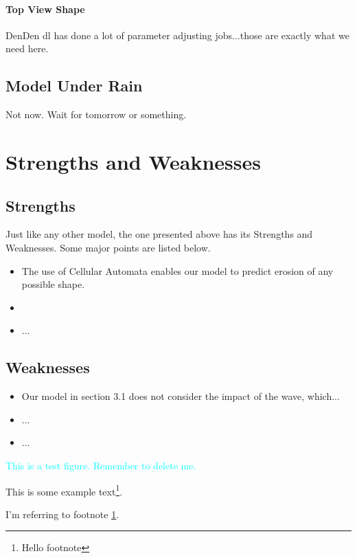 \documentclass[12pt]{article}
\begin{document}
\paragraph{Top View Shape}
DenDen dl has done a lot of parameter adjusting jobs...those are exactly what we need here.
\subsection{Model Under Rain}
Not now. Wait for tomorrow or something.


\section{Strengths and Weaknesses}
\subsection{Strengths}
Just like any other model, the one presented above has its Strengths and Weaknesses. Some major points are listed below.
\begin{itemize}
    \item [1)]
          The use of Cellular Automata enables our model to predict erosion of any possible shape.
    \item [2)]

    \item [3)]
          ...
\end{itemize}
\subsection{Weaknesses}
\begin{itemize}
    \item [1)]
          Our model in section 3.1 does not consider the impact of the wave, which...
    \item [2)]
          ...
    \item [3)]
          ...
\end{itemize}

\textcolor{cyan}{This is a test figure. Remember to delete me.}



This is some example text\footnote{\label{myfootnote}Hello footnote}.

I'm referring to footnote \ref{myfootnote}.


\newpage
\begin{appendix}
    \listoffigures
    \listoftables
    \listoflistings
    \printbibliography
\end{appendix}
\end{document}
